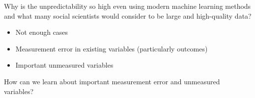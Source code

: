 \documentclass{beamer}
\begin{document}
\begin{frame}

Why is the unpredictability so high even using modern machine learning methods and what many social scientists would consider to be large and high-quality data?
\begin{itemize}
\item Not enough cases \pause
\item Measurement error in existing variables (particularly outcomes) \pause
\item Important unmeasured variables 
\end{itemize}

\end{frame}
\begin{frame}

\begin{center}
\Large{How can we learn about important measurement error and unmeasured variables?}
\end{center}

\end{frame}
\end{document}
